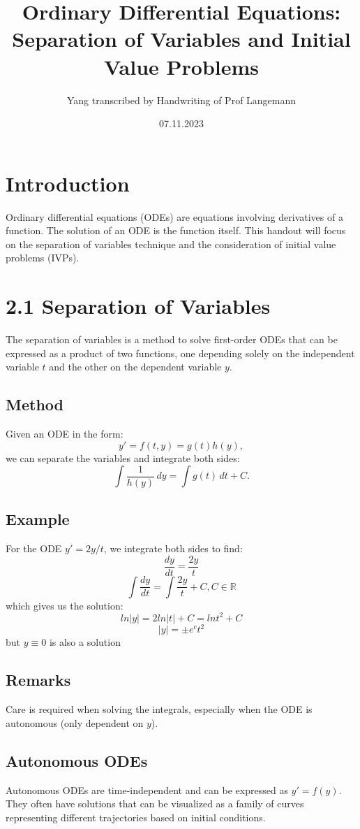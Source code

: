 \documentclass[11pt]{article}
\title{Ordinary Differential Equations: \\ Separation of Variables and Initial Value Problems}
\author{Yang transcribed by Handwriting of Prof Langemann}
\date{07.11.2023}
\begin{document}
\maketitle

\section*{Introduction}
Ordinary differential equations (ODEs) are equations involving derivatives of a function. The solution of an ODE is the function itself. This handout will focus on the separation of variables technique and the consideration of initial value problems (IVPs).

\section*{2.1 Separation of Variables}
The separation of variables is a method to solve first-order ODEs that can be expressed as a product of two functions, one depending solely on the independent variable \( t \) and the other on the dependent variable \( y \).

\subsection*{Method}
Given an ODE in the form:
\[ y' = f(t,y) = g(t)h(y), \]
we can separate the variables and integrate both sides:
\[ \int \frac{1}{h(y)} \, dy = \int g(t) \, dt + C. \]

\subsection*{Example}
For the ODE \( y' = 2y/t \), we integrate both sides to find:
\[\frac{dy}{dt} = \frac{2y}{t}\]
\[ \int \frac{dy}{dt} = \int \frac{2y}{t} + C , C \in \mathbb{R}\]
which gives us the solution:
\[ ln|y| = 2ln|t| + C = ln t^2 + C\]
\[|y| = \pm e^c t^2\]
but \(y \equiv 0\) is also a solution

\subsection*{Remarks}
Care is required when solving the integrals, especially when the ODE is autonomous (only dependent on \( y \)).

\subsection*{Autonomous ODEs}
Autonomous ODEs are time-independent and can be expressed as \( y' = f(y) \). They often have solutions that can be visualized as a family of curves representing different trajectories based on initial conditions.
\end{document}
